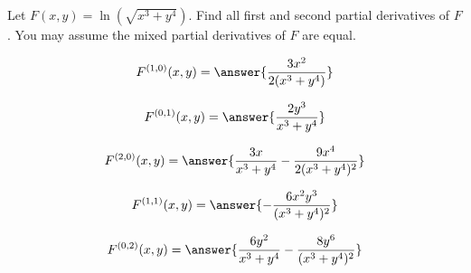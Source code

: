 \documentclass{ximera}
\author{David Guichard \and Neal Koblitz \and H. Jerome Keisler \and Albert Scheller \and Barry Balof \and Mike Wills \and Matthew Carr}
\begin{document}
\begin{exercise}




Let $F(x,y)=\ln(\sqrt{x^3+y^4})$. Find all first and second partial derivatives of $F$. You may assume the mixed partial derivatives of $F$ are equal.

\begin{prompt}
\[
F^{(1,0)}(x,y)=\answer{\frac{3x^2}{2(x^3+y^4)}}
\]
\end{prompt}
\begin{prompt}
\[
F^{(0,1)}(x,y)=\answer{\frac{2y^3}{x^3+y^4}}
\]
\end{prompt}
\begin{prompt}
\[
F^{(2,0)}(x,y)=\answer{\frac{3x}{x^3+y^4}-\frac{9x^4}{2(x^3+y^4)^2}}
\]
\end{prompt}
\begin{prompt}
\[
F^{(1,1)}(x,y)=\answer{-\frac{6x^2y^3}{(x^3+y^4)^2}}
\]
\end{prompt}
\begin{prompt}
\[
F^{(0,2)}(x,y)=\answer{\frac{6y^2}{x^3+y^4}-\frac{8y^6}{(x^3+y^4)^2}}
\]
\end{prompt}

\end{exercise}
\end{document}
